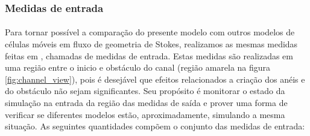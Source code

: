 \documentclass{article}
\theoremstyle{definition}
\begin{document}
\subsubsection{Medidas de entrada}
\paragraph{}
Para tornar possível a comparação do presente modelo com outros modelos de células móveis em fluxo de geometria de Stokes, realizamos as mesmas medidas feitas em \cite{beatrici_comparing_2023}, chamadas de medidas de entrada. Estas medidas são realizadas em uma região entre o inicio e obstáculo do canal (região amarela na figura \ref{fig:channel_view}), pois é desejável que efeitos relacionados a criação dos anéis e do obstáculo não sejam significantes. Seu propósito é monitorar o estado da simulação na entrada da região das medidas de saída e prover uma forma de verificar se diferentes modelos estão, aproximadamente, simulando a mesma situação.
As seguintes quantidades compõem o conjunto das medidas de entrada:
\end{document}
